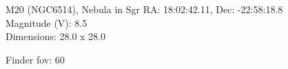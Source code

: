 \begin{block}{M20 (NGC6514), Nebula in Sgr}
    RA: 18:02:42.11, Dec: -22:58:18.8 \\ 
    Magnitude (V): 8.5 \\ 
    Dimensions: 28.0 x 28.0 

    Finder fov: 60 
\end{block}